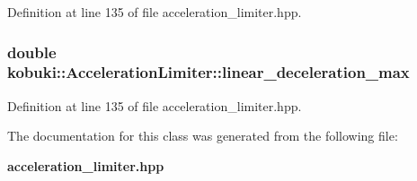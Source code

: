 \-Definition at line 135 of file acceleration\-\_\-limiter.\-hpp.

\subsubsection[{linear\-\_\-deceleration\-\_\-max}]{\setlength{\rightskip}{0pt plus 5cm}double {\bf kobuki\-::\-Acceleration\-Limiter\-::linear\-\_\-deceleration\-\_\-max}\hspace{0.3cm}{\ttfamily  [private]}}\label{classkobuki_1_1AccelerationLimiter_ab9d7e7921aa359762a4e62776fad2447}


\-Definition at line 135 of file acceleration\-\_\-limiter.\-hpp.



\-The documentation for this class was generated from the following file\-:\begin{DoxyCompactItemize}
\item 
{\bf acceleration\-\_\-limiter.\-hpp}\end{DoxyCompactItemize}

